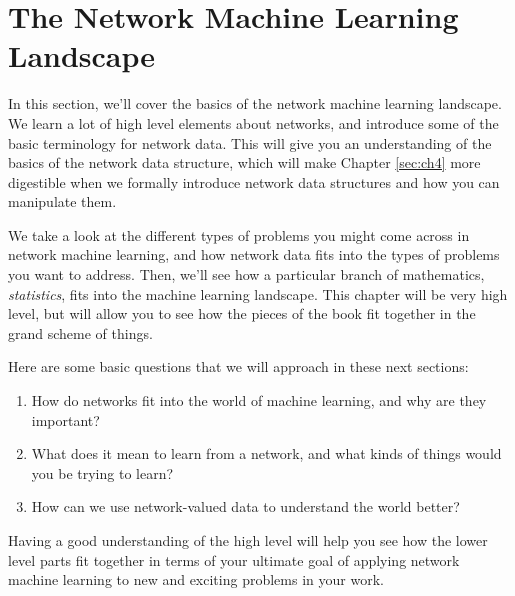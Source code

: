 \chapter{The Network Machine Learning Landscape}
\label{sec:ch1}

In this section, we'll cover the basics of the network machine learning landscape. We learn a lot of high level elements about networks, and introduce some of the basic terminology for network data. This will give you an understanding of the basics of the network data structure, which will make Chapter \ref{sec:ch4} more digestible when we formally introduce network data structures and how you can manipulate them. 

We take a look at the different types of problems you might come across in network machine learning, and how network data fits into the types of problems you want to address. Then, we'll see how a particular branch of mathematics,  \emph{statistics}, fits into the machine learning landscape. This chapter will be very high level, but will allow you to see how the pieces of the book fit together in the grand scheme of things. 

Here are some basic questions that we will approach in these next sections:
\begin{enumerate}
    \item How do networks fit into the world of machine learning, and why are they important?
    \item What does it mean to learn from a network, and what kinds of things would you be trying to learn?
    \item How can we use network-valued data to understand the world better?
\end{enumerate}

Having a good understanding of the high level will help you see how the lower level parts fit together in terms of your ultimate goal of applying network machine learning to new and exciting problems in your work. 

\newpage 


% 





